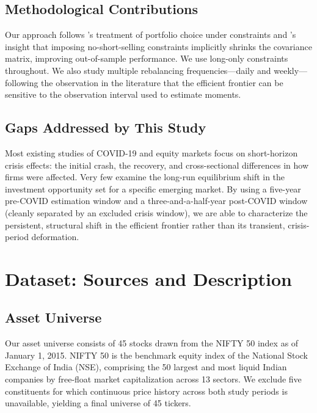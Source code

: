 \documentclass[12pt,a4paper]{article}
\begin{document}
\subsection{Methodological Contributions}

Our approach follows \citet{Brandt2009}'s treatment of portfolio choice under constraints
and \citet{JagannathanMa2003}'s insight that imposing no-short-selling constraints
implicitly shrinks the covariance matrix, improving out-of-sample performance. We use
long-only constraints throughout. We also study multiple rebalancing frequencies---daily
and weekly---following the observation in the literature that the efficient frontier can
be sensitive to the observation interval used to estimate moments.

\subsection{Gaps Addressed by This Study}

Most existing studies of COVID-19 and equity markets focus on short-horizon crisis effects:
the initial crash, the recovery, and cross-sectional differences in how firms were
affected. Very few examine the long-run equilibrium shift in the investment opportunity
set for a specific emerging market. By using a five-year pre-COVID estimation window and
a three-and-a-half-year post-COVID window (cleanly separated by an excluded crisis
window), we are able to characterize the persistent, structural shift in the efficient
frontier rather than its transient, crisis-period deformation.

\section{Dataset: Sources and Description}
\label{sec:data}

\subsection{Asset Universe}

Our asset universe consists of 45 stocks drawn from the NIFTY 50 index as of January 1,
2015. NIFTY 50 is the benchmark equity index of the National Stock Exchange of India (NSE),
comprising the 50 largest and most liquid Indian companies by free-float market
capitalization across 13 sectors. We exclude five constituents for which continuous price
history across both study periods is unavailable, yielding a final universe of 45 tickers.
\end{document}
